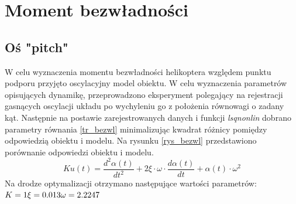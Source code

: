 \section{Moment bezwładności}
\subsection{Oś "pitch"}
W celu wyznaczenia momentu bezwładności helikoptera względem punktu podporu przyjęto oscylacyjny model obiektu. W celu wyznaczenia parametrów opisujących dynamikę, przeprowadzono eksperyment polegający na rejestracji gasnących oscylacji układu po wychyleniu go z położenia równowagi o zadany kąt. Następnie na postawie zarejestrowanych danych i funkcji  \textit{lsqnonlin} dobrano parametry równania \ref{tr_bezwl} minimalizując kwadrat różnicy pomiędzy odpowiedzią obiektu i modelu. Na rysunku \ref{rys_bezwl} przedstawiono porównanie odpowiedzi obiektu i modelu. 
\begin{equation}\label{tr_bezwl}
Ku(t) = \frac{d^2\alpha(t) }{dt^2} + 2\xi \cdot \omega \cdot \frac{d\alpha(t) }{dt} + \alpha(t) \cdot \omega^2
\end{equation}
\newpage
Na drodze optymalizacji otrzymano następujące wartości parametrów:\\
$
K = 1 \\
\xi = 0.013 \\
\omega = 2.2247\\
$

